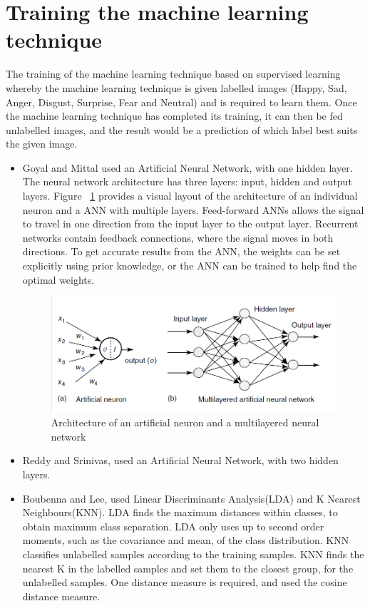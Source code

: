 
\section{Training the machine learning technique}
The training of the machine learning technique based on supervised learning whereby the machine learning technique is given labelled images (Happy, Sad, Anger, Disgust, Surprise, Fear and Neutral) and is required to learn them. Once the machine learning technique has completed its training, it can then be fed unlabelled images, and the result would be a prediction of which label best suits the given image. 
\begin{itemize}
\item Goyal and Mittal used an Artificial Neural Network, with one hidden layer. The neural network architecture has three layers: input, hidden and output layers. Figure ~\ref{fig:nn} provides a visual layout of the architecture of an individual neuron and a ANN with multiple layers. Feed-forward ANNs allows the signal to travel in one direction from the input layer to the output layer. Recurrent networks contain feedback connections, where the signal moves in both directions. To get accurate results from the ANN, the weights can be set explicitly using prior knowledge, or the ANN can be trained to help find the optimal weights\cite{1, ann}.
\begin{figure}[ht]
  \centering
  \includegraphics[scale=0.4]{8}
  \caption{Architecture of an artificial neuron and a multilayered neural network }
  \label{fig:nn}
\end{figure}
\item Reddy and Srinivas, used an Artificial Neural Network, with two hidden layers\cite{2}. 
\item Boubenna and Lee, used Linear Discriminants Analysis(LDA) and K Nearest Neighbours(KNN). LDA finds the maximum distances within classes, to obtain maximum class separation. LDA only uses up to second order moments, such as the covariance and mean, of the class distribution. KNN classifies unlabelled samples according to the training samples. KNN finds the nearest K in the labelled samples and set them to the closest group, for the unlabelled samples. One distance measure is required, and \cite{3} used the cosine distance measure.
\end{itemize}
